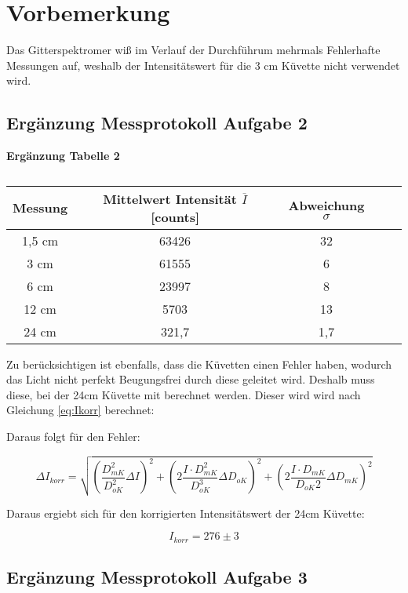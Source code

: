 \section{Vorbemerkung}
Das Gitterspektromer wiß im Verlauf der Durchführum mehrmals Fehlerhafte Messungen auf, weshalb der Intensitätswert für die 3 cm Küvette nicht verwendet wird.

\subsection{Ergänzung Messprotokoll Aufgabe 2}
\begin{table}[h!]
    \centering
    \textbf{Ergänzung Tabelle 2} \\ \smallskip
    \begin{tabular}{c c c c c}
        
        \toprule 
        Messung & Mittelwert Intensität $\overline{I}$[counts] & Abweichung $\sigma$\\
        \midrule
        1,5 cm & 63426 & 32 \\
        3 cm & 61555 & 6 \\
        6 cm & 23997 & 8 \\
        12 cm & 5703 & 13 \\
        24 cm & 321,7 & 1,7 \\
        \bottomrule
        
    \end{tabular}
    \caption{}
\end{table}

Zu berücksichtigen ist ebenfalls, dass die Küvetten einen
Fehler haben, wodurch das Licht nicht perfekt Beugungsfrei
durch diese geleitet wird. Deshalb muss diese, bei der 24cm Küvette mit berechnet werden. Dieser wird wird nach Gleichung \ref{eq:Ikorr} berechnet:

Daraus folgt für den Fehler:

\begin{equation}
    \Delta I_{korr} = \sqrt{(\frac{D_{mK}^2}{D_{oK}^2} \Delta I)^2 + (2\frac{I \cdot D_{mK}^2}{D_{oK}^3}\Delta D_{oK})^2 + (2 \frac{I \cdot D_{mK}}{D_{oK}2} \Delta D_{mK})^2}
\end{equation}

Daraus ergiebt sich für den korrigierten Intensitätswert der 24cm Küvette:

\[ I_{korr} = 276 \pm 3 \]

\subsection{Ergänzung Messprotokoll Aufgabe 3}


